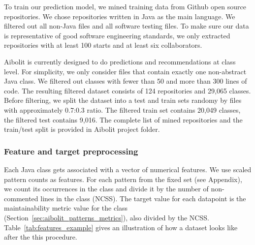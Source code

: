 \label{sec:dataset}

To train our prediction model, we mined training data
from Github open source repositories. We chose repositories written in Java
as the main language. We filtered out all non-Java files and all software
testing files. To make sure our data is
representative of good software engineering standards, we only extracted
repositories with at least 100 starts and at least six collaborators.

Aibolit is currently designed to do predictions and recommendations at class
level. For simplicity, we only consider files that contain exactly one
non-abstract Java class.
We filtered out classes with fewer than 50 and more than 300 lines of code.
The resulting filtered dataset consists of 124 repositories and
29,065 classes. Before filtering, we split the dataset into a test and train sets randomy by files with
approximately 0.7:0.3 ratio. The filtered train set contains 20,049 classes,
the filtered test contains 9,016.
The complete list of mined repositories and the train/test split is provided in Aibolit
project folder.

\subsubsection*{Feature and target preprocessing}

Each Java class gets
associated with a vector of numerical features. We use scaled pattern counts as
features. For each pattern from the fixed set
(see Appendix), we count its occurrences in the
class and divide it by the number of non-commented lines in the class (NCSS).
The target value for each datapoint is the maintainability metric value for the
class (Section~\ref{sec:aibolit_patterns_metrics}), also divided by the NCSS.
Table~\ref{tab:features_example}
gives an illustration of how a dataset looks like after the this procedure.


%
%


